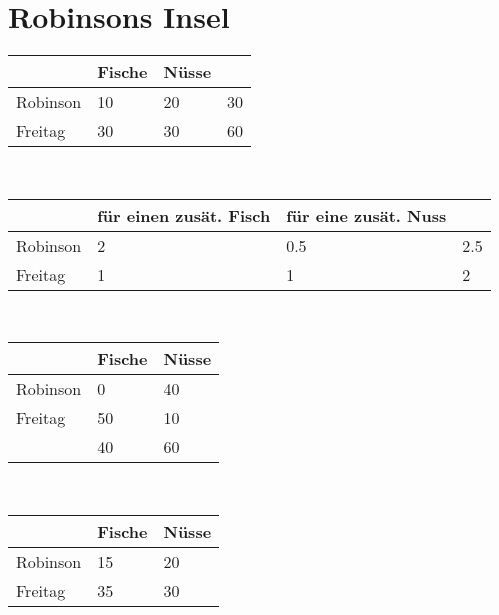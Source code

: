 \documentclass[12pt,a4paper]{report}
\begin{document}
	\section{Robinsons Insel}
	\begin{tabularx}{\textwidth}{|X|X|X|X|}
		\hline
		& Fische & Nüsse & \\
		\hline
		Robinson & 10 & 20 & 30 \\
		\hline
		Freitag & 30 & 30 & 60\\
		\hline
	\end{tabularx}
	\\[1cm]
	\begin{tabularx}{\textwidth}{|X|X|X|X|}
		\hline
		& für einen zusät. Fisch & für eine zusät. Nuss & \\
		\hline
		Robinson & 2 & 0.5 & 2.5 \\
		\hline
		Freitag & 1 & 1 & 2\\
		\hline
	\end{tabularx}
	\\[1cm]
	\begin{tabularx}{\textwidth}{|X|X|X|}
		\hline
		& Fische & Nüsse \\
		\hline
		Robinson & 0 & 40  \\
		\hline
		Freitag & 50 & 10 \\
		\hline
		& 40 & 60 \\
		\hline
	\end{tabularx}
	\\[1cm]
	\begin{tabularx}{\textwidth}{|X|X|X|}
		\hline
		& Fische & Nüsse \\
		\hline
		Robinson & 15 & 20  \\
		\hline
		Freitag & 35 & 30 \\
		\hline
	\end{tabularx}
	
\end{document}
